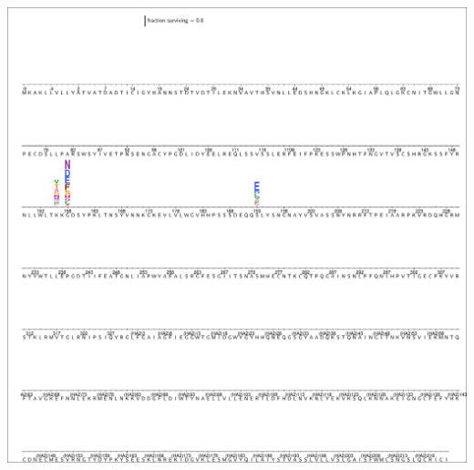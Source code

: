 \documentclass[11pt]{article}
\begin{document}
\begin{suppfigure}
\centerline{\includegraphics[trim=0.1cm 0.02cm 0.1cm 0.03cm,clip=true,width=\textwidth]{figs/logoplots/S139_fracsurvive.pdf}}
\caption{\label{suppfig:S139logo}
{\bf The excess fraction surviving selection with antibody S139/1 for all amino-acid mutations.}
The excess fraction surviving for each replicate was computed using Equation~\ref{eq:fracsurvive_excess}, then we took the median across all technical and biological replicates for each antibody concentration, and then took the medians of those values across concentrations.
The height of each letter is proportional to the excess fraction surviving of virions with that mutation.
The scale bar at the top of the plot relates the letter heights to the actual fractions.
The sites are labeled using H3 numbering.
}
\end{suppfigure}
\end{document}
